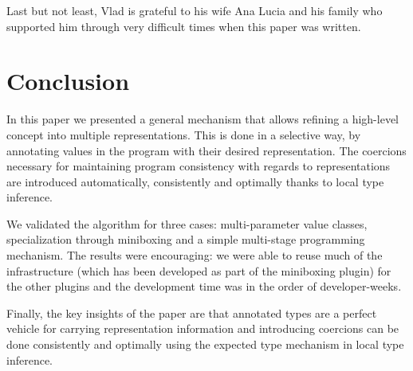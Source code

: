 Last but not least, Vlad is grateful to his wife Ana Lucia and his family who supported him through very difficult times when this paper was written. 

\section{Conclusion}

In this paper we presented a general mechanism that allows refining a high-level concept into multiple representations. This is done in a selective way, by annotating  values in the program with their desired representation. The coercions necessary for maintaining program consistency with regards to representations are introduced automatically, consistently and optimally thanks to local type inference.

We validated the algorithm for three cases: multi-pa\-ram\-e\-ter value classes, specialization through miniboxing and a simple multi-stage programming mechanism. The results were encouraging: we were able to reuse much of the infrastructure (which has been developed as part of the miniboxing plugin) for the other plugins and the development time was in the order of developer-weeks.

Finally, the key insights of the paper are that annotated types are a perfect vehicle for carrying representation information and introducing coercions can be done consistently and optimally using the expected type mechanism in local type inference.


